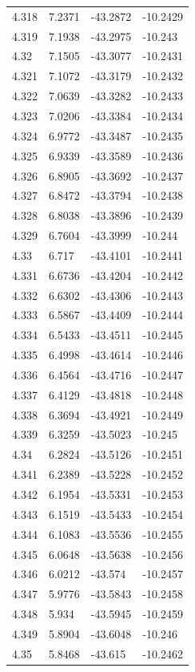 \begin{tabular}{llll}
4.318 & 7.2371 & -43.2872 & -10.2429 \\
4.319 & 7.1938 & -43.2975 & -10.243 \\
4.32 & 7.1505 & -43.3077 & -10.2431 \\
4.321 & 7.1072 & -43.3179 & -10.2432 \\
4.322 & 7.0639 & -43.3282 & -10.2433 \\
4.323 & 7.0206 & -43.3384 & -10.2434 \\
4.324 & 6.9772 & -43.3487 & -10.2435 \\
4.325 & 6.9339 & -43.3589 & -10.2436 \\
4.326 & 6.8905 & -43.3692 & -10.2437 \\
4.327 & 6.8472 & -43.3794 & -10.2438 \\
4.328 & 6.8038 & -43.3896 & -10.2439 \\
4.329 & 6.7604 & -43.3999 & -10.244 \\
4.33 & 6.717 & -43.4101 & -10.2441 \\
4.331 & 6.6736 & -43.4204 & -10.2442 \\
4.332 & 6.6302 & -43.4306 & -10.2443 \\
4.333 & 6.5867 & -43.4409 & -10.2444 \\
4.334 & 6.5433 & -43.4511 & -10.2445 \\
4.335 & 6.4998 & -43.4614 & -10.2446 \\
4.336 & 6.4564 & -43.4716 & -10.2447 \\
4.337 & 6.4129 & -43.4818 & -10.2448 \\
4.338 & 6.3694 & -43.4921 & -10.2449 \\
4.339 & 6.3259 & -43.5023 & -10.245 \\
4.34 & 6.2824 & -43.5126 & -10.2451 \\
4.341 & 6.2389 & -43.5228 & -10.2452 \\
4.342 & 6.1954 & -43.5331 & -10.2453 \\
4.343 & 6.1519 & -43.5433 & -10.2454 \\
4.344 & 6.1083 & -43.5536 & -10.2455 \\
4.345 & 6.0648 & -43.5638 & -10.2456 \\
4.346 & 6.0212 & -43.574 & -10.2457 \\
4.347 & 5.9776 & -43.5843 & -10.2458 \\
4.348 & 5.934 & -43.5945 & -10.2459 \\
4.349 & 5.8904 & -43.6048 & -10.246 \\
4.35 & 5.8468 & -43.615 & -10.2462 \\

\end{tabular}
